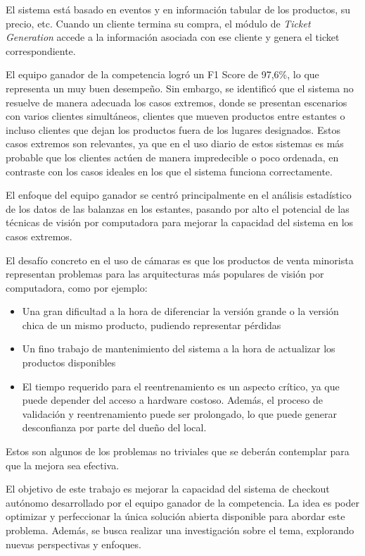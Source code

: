 \documentclass[
11pt, %
]{charter}
\begin{document}
El sistema está basado en eventos y en información tabular de los productos, su precio, etc. Cuando un cliente termina su compra, el módulo de \textit{Ticket Generation} accede a la información asociada con ese cliente y genera el ticket correspondiente. 

El equipo ganador de la competencia logró un F1 Score de 97,6\%, lo que representa un muy buen desempeño. Sin embargo, se identificó que el sistema no resuelve de manera adecuada los casos extremos, donde se presentan escenarios con varios clientes simultáneos, clientes que mueven productos entre estantes o incluso clientes que dejan los productos fuera de los lugares designados. Estos casos extremos son relevantes, ya que en el uso diario de estos sistemas es más probable que los clientes actúen de manera impredecible o poco ordenada, en contraste con los casos ideales en los que el sistema funciona correctamente.

El enfoque del equipo ganador se centró principalmente en el análisis estadístico de los datos de las balanzas en los estantes, pasando por alto el potencial de las técnicas de visión por computadora para mejorar la capacidad del sistema en los casos extremos.

El desafío concreto en el uso de cámaras es que los productos de venta minorista representan problemas para las arquitecturas más populares de visión por computadora, como por ejemplo:
\begin{itemize}
	\item Una gran dificultad a la hora de diferenciar la versión grande o la versión chica de un mismo producto, pudiendo representar pérdidas
	\item Un fino trabajo de mantenimiento del sistema a la hora de actualizar los productos disponibles
	\item El tiempo requerido para el reentrenamiento es un aspecto crítico, ya que puede depender del acceso a hardware costoso. Además, el proceso de validación y reentrenamiento puede ser prolongado, lo que puede generar desconfianza por parte del dueño del local.
\end{itemize}
Estos son algunos de los problemas no triviales que se deberán contemplar para que la mejora sea efectiva.

El objetivo de este trabajo es mejorar la capacidad del sistema de checkout autónomo desarrollado por el equipo ganador de la competencia. La idea es poder optimizar y perfeccionar la única solución abierta disponible para abordar este problema. Además, se busca realizar una investigación sobre el tema, explorando nuevas perspectivas y enfoques.
\end{document}
